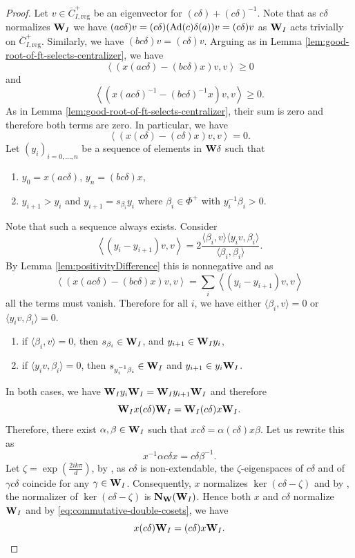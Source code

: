 \documentclass[article, 10pt, oneside, reqno]{amsart}
\theoremstyle{plain}
\theoremstyle{definition}
\theoremstyle{remark}
\newcommand{\reg}{\mathrm{reg}}
\begin{document}
\begin{proof}
Let $v \in \overline{C}^+_{I, \reg}$ be an eigenvector for $(c\delta) + (c\delta)^{-1}$. Note that as $c\delta$ normalizes $\mathbf{W}_I$ we have $(ac\delta)v = (c\delta)(\mathrm{Ad}(c)\delta(a))v = (c\delta)v$ as $\mathbf{W}_I$ acts trivially on $\overline{C}^+_{I, \reg}$. Similarly, we have $(bc\delta)v = (c\delta)v$. Arguing as in Lemma \ref{lem:good-root-of-ft-selects-centralizer}, we have 
$$\left\langle (x(ac\delta) - (bc\delta)x)v, v \right\rangle \geq 0$$
and 
$$\left\langle (x(ac\delta)^{-1} - (bc\delta)^{-1}x)v, v \right\rangle \geq 0.$$
As in Lemma \ref{lem:good-root-of-ft-selects-centralizer}, their sum is zero and therefore both terms are zero. In particular, we have 
$$\left\langle (x(c\delta) - (c\delta)x)v, v \right\rangle = 0.$$
Let $(y_i)_{i = 0, \dots, n}$ be a sequence of elements in $\mathbf{W}\delta$ such that 
\begin{enumerate}
\item $y_0 = x(ac\delta)$, $y_n = (bc\delta)x$, 
\item $y_{i+1} > y_i$ and $y_{i+1} = s_{\beta_i}y_i$ where $\beta_i \in \Phi^+$ with $y_i^{-1}\beta_i > 0$.  
\end{enumerate}
Note that such a sequence always exists. Consider 
$$\left\langle (y_i - y_{i+1})v, v\right\rangle = 2\frac{\langle \beta_i, v\rangle\langle y_iv, \beta_i\rangle}{\langle \beta_i, \beta_i \rangle}.$$
By Lemma \ref{lem:positivityDifference} this is nonnegative and as 
$$\left\langle (x(ac\delta) - (bc\delta)x)v, v \right\rangle = \sum_i \left\langle (y_i - y_{i+1})v, v\right\rangle$$
all the terms must vanish. Therefore for all $i$, we have either $\langle \beta_i, v\rangle = 0$ or $\langle y_iv, \beta_i\rangle = 0$. 
\begin{enumerate}
\item if $\langle \beta_i, v\rangle = 0$, then $s_{\beta_i} \in \mathbf{W}_I$, and $y_{i+1} \in \mathbf{W}_Iy_i$, 
\item if $\langle y_iv, \beta_i\rangle = 0$, then $s_{y_i^{-1}\beta_i} \in \mathbf{W}_I$ and $y_{i+1} \in y_{i}\mathbf{W}_I$. 
\end{enumerate}
In both cases, we have $\mathbf{W}_I y_i \mathbf{W}_I = \mathbf{W}_I y_{i+1} \mathbf{W}_I$ and therefore 
\begin{equation}\label{eq:commutative-double-cosets}
\mathbf{W}_I x(c\delta)\mathbf{W}_I = \mathbf{W}_I (c\delta)x \mathbf{W}_I.
\end{equation}
Therefore, there exist $\alpha, \beta \in \mathbf{W}_I$ such that $xc\delta = \alpha(c\delta)x\beta$. Let us rewrite this as 
$$x^{-1}\alpha c\delta x = c\delta \beta^{-1}.$$
Let $\zeta = \exp(\frac{2ik\pi}{d})$, by \cite[Theorem 8.3, (iii)]{DigneMichelParabolic}, as $c\delta$ is non-extendable, the $\zeta$-eigenspaces of $c\delta$ and of $\gamma c\delta$ coincide for any $\gamma \in \mathbf{W}_I$. Consequently, $x$ normalizes $\ker(c\delta - \zeta)$ and by \cite[Lemma 8.7]{DigneMichelParabolic}, the normalizer of $\ker(c\delta - \zeta)$ is $\mathbf{N}_{\mathbf{W}}(\mathbf{W}_I)$. Hence both $x$ and $c\delta$ normalize $\mathbf{W}_I$ and by \eqref{eq:commutative-double-cosets}, we have 
$$x(c\delta)\mathbf{W}_I = (c\delta)x \mathbf{W}_I.$$
\end{proof}
\end{document}
